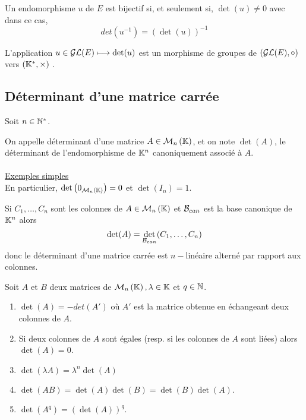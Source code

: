 \begin{defprop}
    Un endomorphisme \(u\) de \(E\) est bijectif si, et seulement si, \(\det (u)\neq 0\) avec dans ce cas,
    \[det (u^{-1}) = (\det (u))^{-1}\]
\end{defprop}
\begin{defprop}
    L’application \(u \in  \cal{GL}(E) \mapsto \det (u)\) est un morphisme de groupes de \(\paren{\cal{GL}(E), \circ}\) vers \(\paren{\Ks, \times}\) .
\end{defprop}
\subsection{Déterminant d’une matrice carrée}
    Soit \(n \in  \Ns\).
\begin{defi}
    On appelle déterminant d’une matrice \(A \in  \M{n}\), et on note \(\det (A)\), le déterminant de l’endomorphisme de \(\K^n\) canoniquement associé à \(A\).\\~\\
    \underline{Exemples simples}\\
    En particulier, \(\det \paren{0_{\M{n}}} = 0\) et \(\det (I_n) = 1\).  
\end{defi}
\begin{defprop}
    Si \(C_1, \dots  , C_n\) sont les colonnes de \(A \in  \M{n}\) et \(\cal{B}_{can}\) est la base canonique de \(\K^n\) alors
    \[\det(A) = \det_{\cal{B}_{can}} (C_1, \dots  , C_n)\]
    donc le déterminant d’une matrice carrée est \(n-\)linéaire  alterné par rapport aux colonnes.
\end{defprop}

\begin{prop}
    Soit \(A\) et \(B\) deux matrices de \(\M{n}, \lambda \in  \K\) et \(q \in \N\).
    \begin{enumerate}
        \item \(\det(A) = -det(A')\) où \(A'\) est la matrice obtenue en échangeant deux colonnes de \(A\).
        \item Si deux colonnes de \(A\) sont égales (resp. si les colonnes de \(A\) sont liées) alors \(\det(A) = 0\).
        \item \(\det(\lambda A) = \lambda^n \det(A)\)
        \item \(\det(AB) = \det(A) \det(B) = \det(B) \det(A)\).
        \item \(\det(A^q) = (\det(A))^q\).
    \end{enumerate}
\end{prop}

